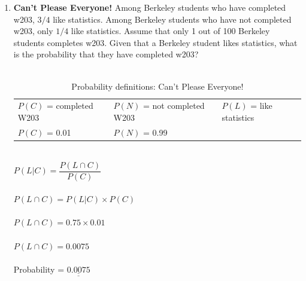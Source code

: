 \documentclass[12pt,a4paper]{article}
\numberwithin{equation}{subsection}
\def\doubleunderline#1{\underline{\underline{#1}}}
\begin{document}
\begin{enumerate}

\item \textbf{Can't Please Everyone!}
Among Berkeley students who have completed w203, $3/4$ like statistics.  Among Berkeley students who have not completed w203, only $1/4$ like statistics.  Assume that only 1 out of 100 Berkeley students completes w203.  Given that a Berkeley student likes statistics, what is the probability that they have completed w203? \\ \\
\begin{table}[h]
\centering
\begin{tabular}{lll}
    $P(C)$ = completed W203 & $P(N)$ = not completed W203 & $P(L)$ = like statistics \\
    $P(C)$ = 0.01 & $P(N)$ = 0.99 &
\end{tabular}
\caption{Probability definitions: Can't Please Everyone!}
\end{table} \\
$P(L|C) = \dfrac{P(L \cap C)}{P(C)}$ \\ \\
$P(L \cap C) = P(L|C) \times P(C)$ \\ \\
$P(L \cap C) = 0.75 \times 0.01$ \\ \\
$P(L \cap C) = 0.0075$ \\ \\
Probability = $\doubleunderline{0.0075}$

\end{enumerate}
\end{document}
